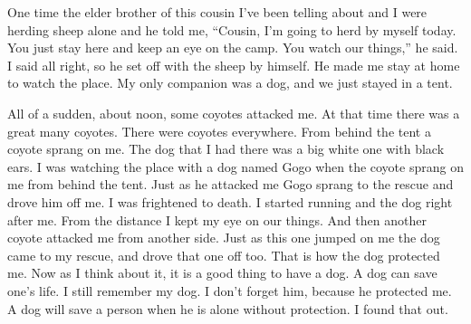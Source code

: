 One time the elder brother of this cousin I've been telling about and I were herding sheep alone and he told me, ``Cousin, I'm going to herd by myself today. You just stay here and keep an eye on the camp. You watch our things,'' he said. I said all right, so he set off with the sheep by himself. He made me stay at home to watch the place. My only companion was a dog, and we just stayed in a tent.

All of a sudden, about noon, some coyotes attacked me. At that time there was a great many coyotes. There were coyotes everywhere. From behind the tent a coyote sprang on me. The dog that I had there was a big white one with black ears. I was watching the place with a dog named Gogo when the coyote sprang on me from behind the tent. Just as he attacked me Gogo sprang to the rescue and drove him off me. I was frightened to death. I started running and the dog right after me. From the distance I kept my eye on our things. And then another coyote attacked me from another side. Just as this one jumped on me the dog came to my rescue, and drove that one off too. That is how the dog protected me. Now as I think about it, it is a good thing to have a dog. A dog can save one's life. I still remember my dog. I don't forget him, because he protected me. A dog will save a person when he is alone without protection. I found that out.

